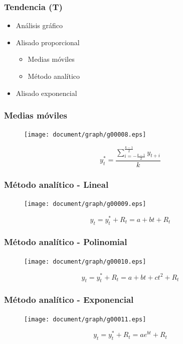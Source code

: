 \documentclass{beamer}
\begin{document}
\begin{frame}
\frametitle{Tendencia (T)}
\begin{itemize}
\item Análisis gráfico
\item Alisado proporcional
\begin{itemize}
\item Medias móviles
\item Método analítico
\end{itemize}
\item Alisado exponencial
\end{itemize}
\end{frame}

\begin{frame}
\frametitle{Medias móviles}
\begin{figure}
\texttt{[image: document/graph/g00008.eps]}
\end{figure}
\begin{equation}
y_t^* = \displaystyle\frac{\displaystyle\sum_{i=-\frac{k-1}{2}}^{\frac{k-1}{2}}y_{t+i}}{k}
\end{equation}
\end{frame}

\begin{frame}
\frametitle{Método analítico - Lineal}
\begin{figure}
\texttt{[image: document/graph/g00009.eps]}
\end{figure}
\begin{equation}
y_t = y_t^* + R_t = a + bt + R_t
\end{equation}
\end{frame}

\begin{frame}
\frametitle{Método analítico - Polinomial}
\begin{figure}
\texttt{[image: document/graph/g00010.eps]}
\end{figure}
\begin{equation}
y_t = y_t^* + R_t = a + bt + ct^2 + R_t
\end{equation}
\end{frame}

\begin{frame}
\frametitle{Método analítico - Exponencial}
\begin{figure}
\texttt{[image: document/graph/g00011.eps]}
\end{figure}
\begin{equation}
y_t = y_t^* + R_t = a e^{bt} + R_t
\end{equation}
\end{frame}
\end{document}
